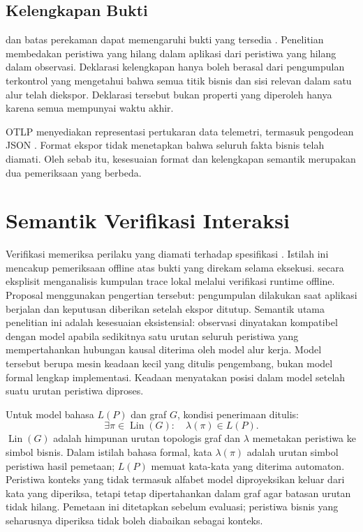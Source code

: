 \subsection{Kelengkapan Bukti}
 dan batas perekaman dapat memengaruhi bukti yang tersedia \citep{otelsdk}. Penelitian membedakan peristiwa yang hilang dalam aplikasi dari peristiwa yang hilang dalam observasi. Deklarasi kelengkapan hanya boleh berasal dari pengumpulan terkontrol yang mengetahui bahwa semua titik bisnis dan sisi relevan dalam satu alur telah diekspor. Deklarasi tersebut bukan properti yang diperoleh hanya karena semua  mempunyai waktu akhir.

OTLP menyediakan representasi pertukaran data telemetri, termasuk pengodean JSON \citep{otlp}. Format ekspor tidak menetapkan bahwa seluruh fakta bisnis telah diamati. Oleh sebab itu, kesesuaian format dan kelengkapan semantik merupakan dua pemeriksaan yang berbeda.

\section{Semantik Verifikasi Interaksi}
\label{sec:semantik}
Verifikasi  memeriksa perilaku yang diamati terhadap spesifikasi \citep{leucker2009}. Istilah ini mencakup pemeriksaan offline atas bukti yang direkam selama eksekusi. \citet{mahe2022} secara eksplisit menganalisis kumpulan trace lokal melalui verifikasi runtime offline. Proposal menggunakan pengertian tersebut: pengumpulan dilakukan saat aplikasi berjalan dan keputusan diberikan setelah ekspor ditutup. Semantik utama penelitian ini adalah kesesuaian eksistensial: observasi dinyatakan kompatibel dengan model apabila sedikitnya satu urutan seluruh peristiwa yang mempertahankan hubungan kausal diterima oleh model alur kerja. Model tersebut berupa mesin keadaan kecil yang ditulis pengembang, bukan model formal lengkap implementasi. Keadaan menyatakan posisi dalam model setelah suatu urutan peristiwa diproses.

Untuk model bahasa $L(P)$ dan graf $G$, kondisi penerimaan ditulis:
\begin{equation}
  \exists\pi\in\operatorname{Lin}(G):\quad \lambda(\pi)\in L(P).
  \label{eq:existential}
\end{equation}
$\operatorname{Lin}(G)$ adalah himpunan urutan topologis graf dan $\lambda$ memetakan peristiwa ke simbol bisnis. Dalam istilah bahasa formal, kata $\lambda(\pi)$ adalah urutan simbol peristiwa hasil pemetaan; $L(P)$ memuat kata-kata yang diterima automaton. Peristiwa konteks yang tidak termasuk alfabet model diproyeksikan keluar dari kata yang diperiksa, tetapi tetap dipertahankan dalam graf agar batasan urutan tidak hilang. Pemetaan ini ditetapkan sebelum evaluasi; peristiwa bisnis yang seharusnya diperiksa tidak boleh diabaikan sebagai konteks.

